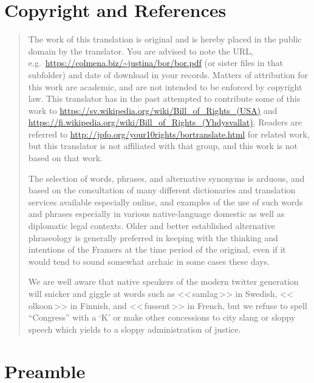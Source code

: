 \documentclass[a4,landscape,12pt]{article}
\begin{document}
\section*{Copyright and References}

\begin{quote}
The work of this translation is original and is hereby placed in the public domain by the translator. You are advised to note the URL, e.g.~\url{https://colmena.biz/~justina/bor/bor.pdf} (or sister files in that subfolder) and date of download in your records. Matters of attribution for this work are academic, and are not intended to be enforced by copyright law. This translator has in the past attempted to contribute some of this work to \foreignlanguage{swedish}{\url{https://sv.wikipedia.org/wiki/Bill_of_Rights_(USA)}} and \foreignlanguage{finnish}{\url{https://fi.wikipedia.org/wiki/Bill_of_Rights_(Yhdysvallat)}}. Readers are referred to \url{http://jpfo.org/your10rights/bortranslate.html} for related work, but this translator is not affiliated with that group, and this work is not based on that work.

	The selection of words, phrases, and alternative synonyms is arduous, and based on the consultation of many different dictionaries and translation services available especially online, and examples of the use of such words and phrases especially in various native-language domestic as well as diplomatic legal contexts. Older and better established alternative phraseology is generally preferred in keeping with the thinking and intentions of the Framers at the time period of the original, even if it would tend to sound somewhat archaic in some cases these days.

	We are well aware that native speakers of the modern twitter generation will snicker and giggle at words such as \foreignlanguage{swedish}{<<\,samlag\,>>} in Swedish, \foreignlanguage{finnish}{<<\,olkoon\,>>} in Finnish, and \foreignlanguage{french}{<<\,fussent\,>>} in French, but we refuse to spell ``Congress'' with a `K' or make other concessions to city slang or sloppy speech which yields to a sloppy administration of justice.
\end{quote}

\section*{Preamble}
\end{document}
